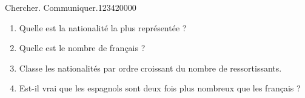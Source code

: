 \begin{pageParcoursu}
\begin{ExoCu}{Chercher. Communiquer.}{1234}{2}{0}{0}{0}{0}
\begin{minipage}{0.48\linewidth}
\end{minipage}
\begin{minipage}{0.48\linewidth}
\begin{enumerate}[leftmargin=*]
\item Quelle est la nationalité la plus représentée ?
\item Quelle est le nombre de français ? 
\item Classe les nationalités par ordre croissant du nombre de ressortissants.
\item Est-il vrai que les espagnols sont deux fois plus nombreux que les français ?
\end{enumerate}
\end{minipage}


 \end{ExoCu}

 
 
\end{pageParcoursu}


